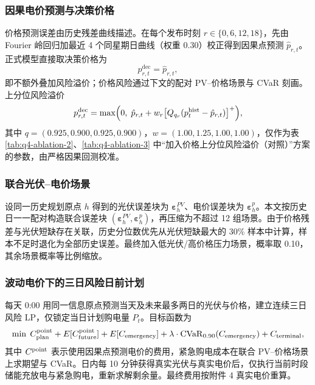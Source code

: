 \documentclass[withoutpreface,bwprint]{cumcmthesis} %
\begin{document}
\subsubsection{因果电价预测与决策价格}

价格预测误差由历史残差曲线描述。在每个发布时刻 \(r\in\{0,6,12,18\}\)，先由 Fourier 岭回归加最近 4 个同星期日曲线（权重 0.30）校正得到因果点预测 \(\hat p_{r,t}\)。正式模型直接取决策价格为
\begin{equation}
    p^{\mathrm{dec}}_{r,t}=\hat p_{r,t},
\end{equation}
即不额外叠加风险溢价；价格风险通过下文的配对 PV--价格场景与 CVaR 刻画。上分位风险溢价
\begin{equation}
    p^{\mathrm{dec}}_{r,t}=\max\Bigl(0,\;\hat p_{r,t}+w_r\bigl[Q_{q_r}(p^{\mathrm{hist}}_t-\hat p_{r,t})\bigr]^+\Bigr),
\end{equation}
其中 \(q=(0.925,0.900,0.925,0.900)\)，\(w=(1.00,1.25,1.00,1.00)\)，仅作为表 \ref{tab:q4-ablation-2}、\ref{tab:q4-ablation-3} 中“加入价格上分位风险溢价（对照）”方案的参数，由严格因果回测校准。

\subsubsection{联合光伏--电价场景}

设同一历史规划原点 \(h\) 得到的光伏误差块为 \(\boldsymbol{\varepsilon}^{PV}_h\)、电价误差块为 \(\boldsymbol{\varepsilon}^{p}_h\)。本文按历史日一一配对构造联合误差块 \((\boldsymbol{\varepsilon}^{PV}_h,\boldsymbol{\varepsilon}^{p}_h)\)，再压缩为不超过 12 组场景。由于价格残差与光伏短缺存在关联，历史分位数优先从光伏短缺最大的 30\% 样本中计算，样本不足时退化为全部历史误差。最终加入低光伏/高价格压力场景，概率取 0.10，其余场景概率等比例缩放。

\subsubsection{波动电价下的三日风险日前计划}

每天 0:00 用同一信息原点预测当天及未来最多两日的光伏与价格，建立连续三日风险 LP，仅锁定当日计划购电量 \(P_t\)。目标函数为
\begin{equation}
    \min\; C_{\rm plan}^{\rm point}+E[C_{\rm future}^{\rm point}]+E[C_{\rm emergency}]+\lambda\cdot\mathrm{CVaR}_{0.90}(C_{\rm emergency})+C_{\rm terminal},
\end{equation}
其中 \(C^{\rm point}\) 表示使用因果点预测电价的费用，紧急购电成本在联合 PV--价格场景上求期望与 CVaR。日内每 10 分钟获得真实光伏与真实电价后，仅执行当前时段储能充放电与紧急购电，重新求解剩余量。最终费用按附件 4 真实电价重算。
\end{document}
